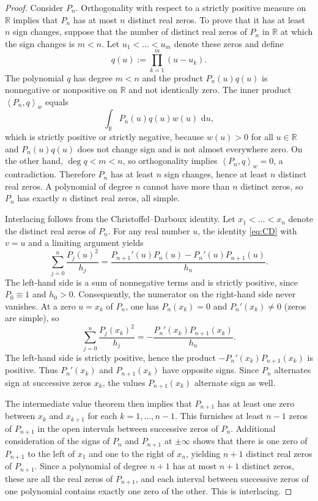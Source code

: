 \documentclass[11pt]{amsart}
\numberwithin{equation}{section}
\theoremstyle{definition}
\newcommand{\R}{\mathbb{R}}
\newcommand{\dd}{\,\mathrm{d}}
\newcommand{\inner}[2]{\left\langle #1,#2\right\rangle_{w}}
\begin{document}
\begin{proof}
Consider $P_{n}$. Orthogonality with respect to a strictly positive measure
on $\R$ implies that $P_{n}$ has at most $n$ distinct real zeros. To prove
that it has at least $n$ sign changes, suppose that the number of distinct
real zeros of $P_{n}$ in $\R$ at which the sign changes is $m<n$. Let
$u_{1}<\dots<u_{m}$ denote these zeros and define
\[
q(u):=\prod_{k=1}^{m}(u-u_{k}).
\]
The polynomial $q$ has degree $m<n$ and the product $P_{n}(u)q(u)$ is
nonnegative or nonpositive on $\R$ and not identically zero. The inner
product $\inner{P_{n}}{q}$ equals
\[
\int_{\R}P_{n}(u)q(u)w(u)\,\dd u,
\]
which is strictly positive or strictly negative, because $w(u)>0$ for all
$u\in\R$ and $P_{n}(u)q(u)$ does not change sign and is not almost everywhere
zero. On the other hand, $\deg q<m<n$, so orthogonality implies
$\inner{P_{n}}{q}=0$, a contradiction. Therefore $P_{n}$ has at least $n$
sign changes, hence at least $n$ distinct real zeros. A polynomial of degree
$n$ cannot have more than $n$ distinct zeros, so $P_{n}$ has exactly $n$
distinct real zeros, all simple.

Interlacing follows from the Christoffel--Darboux identity. Let
$x_{1}<\dots<x_{n}$ denote the distinct real zeros of $P_{n}$. For any real
number $u$, the identity \eqref{eq:CD} with $v=u$ and a limiting argument
yields
\begin{equation}\label{eq:CD-diagonal}
\sum_{j=0}^{n}\frac{P_{j}(u)^{2}}{h_{j}}
=\frac{P_{n+1}'(u)P_{n}(u)-P_{n}'(u)P_{n+1}(u)}{h_{n}}.
\end{equation}
The left-hand side is a sum of nonnegative terms and is strictly positive,
since $P_{0}\equiv 1$ and $h_{0}>0$. Consequently, the numerator on the
right-hand side never vanishes. At a zero $u=x_{k}$ of $P_{n}$, one has
$P_{n}(x_{k})=0$ and $P_{n}'(x_{k})\neq 0$ (zeros are simple), so
\[
\sum_{j=0}^{n}\frac{P_{j}(x_{k})^{2}}{h_{j}}
=-\frac{P_{n}'(x_{k})P_{n+1}(x_{k})}{h_{n}}.
\]
The left-hand side is strictly positive, hence the product
$-P_{n}'(x_{k})P_{n+1}(x_{k})$ is positive. Thus $P_{n}'(x_{k})$ and
$P_{n+1}(x_{k})$ have opposite signs. Since $P_{n}$ alternates sign at
successive zeros $x_{k}$, the values $P_{n+1}(x_{k})$ alternate sign as well.

The intermediate value theorem then implies that $P_{n+1}$ has at least one
zero between $x_{k}$ and $x_{k+1}$ for each $k=1,\dots,n-1$. This furnishes
at least $n-1$ zeros of $P_{n+1}$ in the open intervals between successive
zeros of $P_{n}$. Additional consideration of the signs of $P_{n}$ and
$P_{n+1}$ at $\pm\infty$ shows that there is one zero of $P_{n+1}$ to the left
of $x_{1}$ and one to the right of $x_{n}$, yielding $n+1$ distinct real
zeros of $P_{n+1}$. Since a polynomial of degree $n+1$ has at most $n+1$
distinct zeros, these are all the real zeros of $P_{n+1}$, and each interval
between successive zeros of one polynomial contains exactly one zero of the
other. This is interlacing.
\end{proof}
\end{document}
